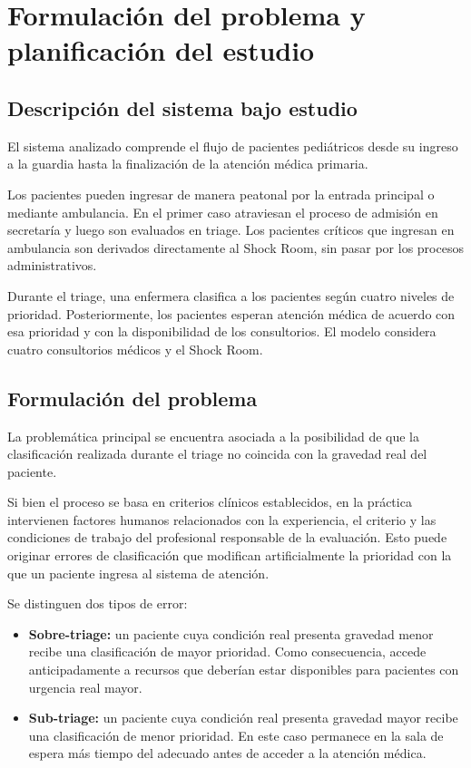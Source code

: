 \section{Formulación del problema y planificación del estudio}

\subsection{Descripción del sistema bajo estudio}

El sistema analizado comprende el flujo de pacientes pediátricos desde su
ingreso a la guardia hasta la finalización de la atención médica primaria.

Los pacientes pueden ingresar de manera peatonal por la entrada principal o
mediante ambulancia. En el primer caso atraviesan el proceso de admisión en
secretaría y luego son evaluados en triage. Los pacientes críticos que
ingresan en ambulancia son derivados directamente al Shock Room, sin pasar
por los procesos administrativos.

Durante el triage, una enfermera clasifica a los pacientes según cuatro
niveles de prioridad. Posteriormente, los pacientes esperan atención médica
de acuerdo con esa prioridad y con la disponibilidad de los consultorios. El
modelo considera cuatro consultorios médicos y el Shock Room.

\subsection{Formulación del problema}

La problemática principal se encuentra asociada a la posibilidad de que la
clasificación realizada durante el triage no coincida con la gravedad real
del paciente.

Si bien el proceso se basa en criterios clínicos establecidos, en la práctica
intervienen factores humanos relacionados con la experiencia, el criterio y
las condiciones de trabajo del profesional responsable de la evaluación. Esto
puede originar errores de clasificación que modifican artificialmente la
prioridad con la que un paciente ingresa al sistema de atención.

Se distinguen dos tipos de error:

\begin{itemize}
  \item \textbf{Sobre-triage:} un paciente cuya condición real presenta
  gravedad menor recibe una clasificación de mayor prioridad. Como
  consecuencia, accede anticipadamente a recursos que deberían estar
  disponibles para pacientes con urgencia real mayor.
  \item \textbf{Sub-triage:} un paciente cuya condición real presenta
  gravedad mayor recibe una clasificación de menor prioridad. En este caso
  permanece en la sala de espera más tiempo del adecuado antes de acceder a
  la atención médica.
\end{itemize}

